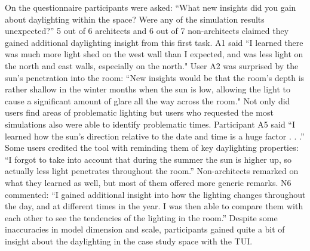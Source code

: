 On the questionnaire participants were asked: ``What new insights did
you gain about daylighting within the space?  Were any of the
simulation results unexpected?''
%
5 out of 6 architects and 6 out of 7 non-architects claimed they
gained additional daylighting insight from this first task.  A1 said
``I learned there was much more light shed on the west wall than I
expected, and was less light on the north and east walls, especially
on the north."  User A2 was surprised by the sun's penetration into
the room: ``New insights would be that the room's depth is rather
shallow in the winter months when the sun is low, allowing the light
to cause a significant amount of glare all the way across the room."
Not only did users find areas of problematic lighting but users who
requested the most simulations also were able to identify problematic
times.  Participant A5 said ``I learned how the sun's direction
relative to the date and time is a huge factor . . .''
Some users credited the tool with reminding them
of key
daylighting properties:
``I forgot to take into account that during the
summer the sun is higher up, so actually less light penetrates
throughout the room.''  Non-architects remarked on what they learned
as well, but most of them offered more generic remarks.  N6 commented:
``I gained additional insight into how the lighting changes throughout
the day, and at different times in the year.  I was then able to
compare them with each other to see the tendencies of the lighting in
the room.''
%
Despite some inaccuracies in model dimension and scale, participants
gained quite a bit of insight about the daylighting in the case study
space with the TUI. 








